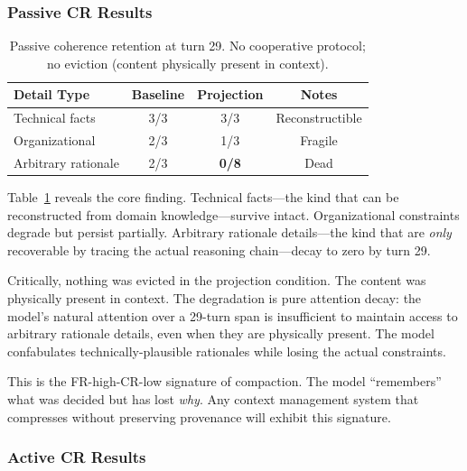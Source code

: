\documentclass[sigplan,screen,anonymous]{acmart}
\begin{document}
\subsubsection{Passive CR Results}

\begin{table}[t]
\centering
\caption{Passive coherence retention at turn 29. No cooperative
  protocol; no eviction (content physically present in context).}
\label{tab:passive-cr}
\begin{tabular}{lccc}
\toprule
Detail Type & Baseline & Projection & Notes \\
\midrule
Technical facts   & 3/3 & 3/3     & Reconstructible \\
Organizational    & 2/3 & 1/3     & Fragile \\
Arbitrary rationale & 2/3 & \textbf{0/8} & Dead \\
\bottomrule
\end{tabular}
\end{table}

Table~\ref{tab:passive-cr} reveals the core finding. Technical
facts---the kind that can be reconstructed from domain
knowledge---survive intact. Organizational constraints degrade but
persist partially. Arbitrary rationale details---the kind that are
\emph{only} recoverable by tracing the actual reasoning chain---decay
to zero by turn 29.

Critically, nothing was evicted in the projection condition. The
content was physically present in context. The degradation is pure
attention decay: the model's natural attention over a 29-turn span is
insufficient to maintain access to arbitrary rationale details, even
when they are physically present. The model confabulates
technically-plausible rationales while losing the actual constraints.

This is the FR-high-CR-low signature of compaction. The model
``remembers'' what was decided but has lost \emph{why}. Any context
management system that compresses without preserving provenance will
exhibit this signature.

\subsubsection{Active CR Results}
\end{document}
